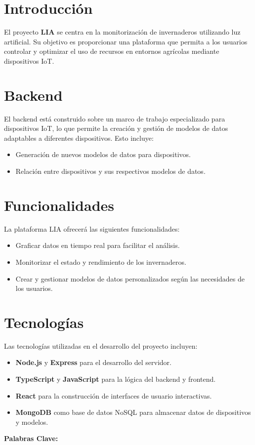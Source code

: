 

\section{Introducción}
El proyecto \textbf{LIA} se centra en la monitorización de invernaderos utilizando luz artificial. Su objetivo es proporcionar una plataforma que permita a los usuarios controlar y optimizar el uso de recursos en entornos agrícolas mediante dispositivos IoT.

\section{Backend}
El backend está construido sobre un marco de trabajo especializado para dispositivos IoT, lo que permite la creación y gestión de modelos de datos adaptables a diferentes dispositivos. Esto incluye:

\begin{itemize}
    \item Generación de nuevos modelos de datos para dispositivos.
    \item Relación entre dispositivos y sus respectivos modelos de datos.
\end{itemize}

\section{Funcionalidades}
La plataforma LIA ofrecerá las siguientes funcionalidades:

\begin{itemize}
    \item Graficar datos en tiempo real para facilitar el análisis.
    \item Monitorizar el estado y rendimiento de los invernaderos.
    \item Crear y gestionar modelos de datos personalizados según las necesidades de los usuarios.
\end{itemize}

\section{Tecnologías}
Las tecnologías utilizadas en el desarrollo del proyecto incluyen:

\begin{itemize}
    \item \textbf{Node.js} y \textbf{Express} para el desarrollo del servidor.
    \item \textbf{TypeScript} y \textbf{JavaScript} para la lógica del backend y frontend.
    \item \textbf{React} para la construcción de interfaces de usuario interactivas.
    \item \textbf{MongoDB} como base de datos NoSQL para almacenar datos de dispositivos y modelos.
\end{itemize}

\makeatletter
\textbf{Palabras Clave:} \@palabras
\makeatother
